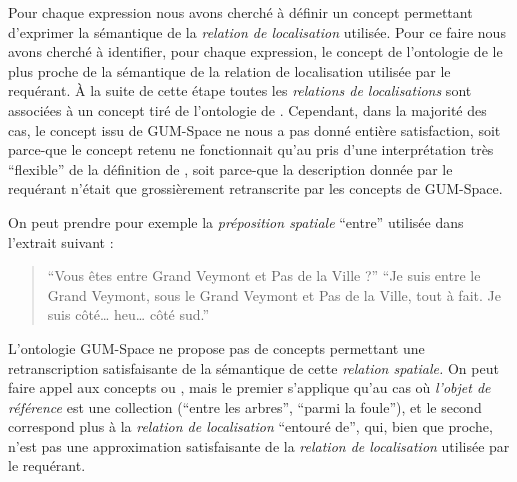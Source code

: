 Pour chaque expression nous avons cherché à définir un concept
permettant d'exprimer la sémantique de la \emph{relation de
  localisation} utilisée.
%
Pour ce faire nous avons cherché à identifier, pour chaque expression,
le concept de l'ontologie de \textcite{Bateman2010} le plus proche de
la sémantique de la relation de localisation utilisée par le
requérant.
%
À la suite de cette étape toutes les \emph{relations de localisations}
sont associées à un concept tiré de l'ontologie de
\textcite{Bateman2010}. Cependant, dans la majorité des cas, le
concept issu de GUM-Space ne nous a pas donné entière satisfaction,
soit parce-que le concept retenu ne fonctionnait qu'au pris d'une
interprétation très \enquote{flexible} de la définition de
\textcite{Bateman2010}, soit parce-que la description donnée par le
requérant n'était que grossièrement retranscrite par les concepts de
GUM-Space.

On peut prendre pour exemple la \emph{préposition spatiale}
\enquote{entre} utilisée dans l'extrait suivant :
%
\begin{quote}
  \begin{dialogue}
    \Sec \enquote{Vous êtes entre Grand Veymont et Pas de la Ville ?}
    \Req \enquote{Je suis entre le Grand Veymont, sous le Grand
      Veymont et Pas de la Ville, tout à fait. Je suis côté… heu… côté
      sud.}
  \end{dialogue}
\end{quote}
%
L'ontologie GUM-Space ne propose pas de concepts permettant une
retranscription satisfaisante de la sémantique de cette \emph{relation
  spatiale.} On peut faire appel aux concepts
 ou , mais le
premier s'applique qu'au cas où \emph{l'objet de référence} est une
collection (\eg \enquote{entre les arbres}, \enquote{parmi la foule}),
et le second correspond plus à la \emph{relation de localisation}
\enquote{entouré de}, qui, bien que proche, n'est pas une
approximation satisfaisante de la \emph{relation de localisation}
utilisée par le requérant.

